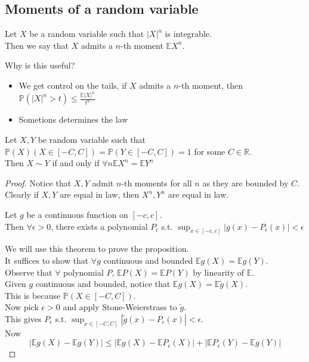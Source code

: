 \documentclass[../main.tex]{subfiles}
\begin{document}
\subsection{Moments of a random variable}
\begin{defn}[Moment ]
	Let $X$ be a random variable such that $|X|^{n}$ is integrable.\\
	Then we say that $X$ admits a $n$-th moment $ \mathbb{E}X^{n}$.\\
\end{defn}
Why is this useful?
\begin{itemize}
\item We get control on the tails, if $X$ admits a $n$-th moment, then $ \mathbb{P}( |X|^{n}>t) \leq \frac{\mathbb{E}|X|^{n}}{ t^{n}}$ 
\item Sometions determines the law 
\end{itemize}
\begin{propo}
Let $X,Y$ be random variable such that $ \mathbb{P}( X) ( X \in [ -C,C] ) = \mathbb{P}( Y \in [ -C,C] ) =1$ for some $C\in \mathbb{R}$.\\
Then $X\sim Y$ if and only if $ \forall n \mathbb{E}X^{n}= \mathbb{E}Y^{n}$
\end{propo}
\begin{proof}
Notice that $X,Y$ admit $n$-th moments for all $n$ as they are bounded by $C$.\\
Clearly if $X,Y$ are equal in law, then $X^{n},Y^{n}$ are equal in law.
\begin{thm}
	Let $g$ be a continuous function on $ [ -c,c] $.\\
	Then $\forall \epsilon>0$, there exists a polynomial $P_\epsilon$ s.t. $\sup_{x\in [ -c,c] } |g( x) - P_\epsilon( x) |< \epsilon$ 
\end{thm}
We will use this theorem to prove the proposition.\\
It suffices to show that $\forall g$ continuous and bounded $ \mathbb{E}g( X) = \mathbb{E}g( Y) $.\\
Observe that $\forall $ polynomial $P$, $ \mathbb{E}P( X) = \mathbb{E}P( Y) $ by linearity of $ \mathbb{E}$.\\
Given $g$ continuous and bounded, notice that $ \mathbb{E}g( X) = \mathbb{E} \tilde g ( X) $.\\
This is because $ \mathbb{P}( X\in [ -C,C] ) $.\\
Now pick $\epsilon>0$ and apply Stone-Weierstrass to $\tilde g$.\\
This gives $P_\epsilon$ s.t. $\sup_{x\in [ -C,C] } |\tilde g( x) - P_\epsilon( x) |< \epsilon$.\\
Now
\[ 
|\mathbb{E}g( X) - \mathbb{E}g( Y)| \leq |\mathbb{E}g( X) - \mathbb{E}P_\epsilon( X) | + | \mathbb{E}P_{\epsilon} ( Y) - \mathbb{E}g( Y) | 
\]

\end{proof}
\end{document}
